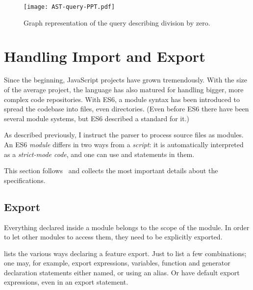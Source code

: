 \begin{figure}[!htb]
	\begin{minipage}{\textwidth}
		
	\end{minipage}
\end{figure}

\begin{figure}[!htb]
  \centering
  \texttt{[image: AST-query-PPT.pdf]}
  \caption{Graph representation of the query describing division by zero.}
  \label{fig:AST-query-PPT}
\end{figure}


\section{Handling Import and Export}
\label{sect:handling-import-export}
Since the beginning, JavaScript projects have grown tremendously. With the size of the average project, the language has also matured for handling bigger, more complex code repositories. With ES6, a module syntax has been introduced to spread the codebase into files, even directories. (Even before ES6 there have been several module systems, but ES6 described a standard for it.)

As described previously, I instruct the parser to process source files as modules. An ES6 \emph{module} differs in two ways from a \emph{script}: it is automatically interpreted as a \emph{strict-mode code}, and one can use  and  statements in them.

This section follows~\cite{ES6InDepth,ES6import,ES6export} and collects the most important details about the specifications.


\subsection{Export}
Everything declared inside a module belongs to the scope of the module. In order to let other modules to access them, they need to be explicitly exported.

 lists the various ways declaring a feature export. Just to list a few combinations; one may, for example, export expressions, variables, function and generator declaration statements either named, or using an alias. Or have default export expressions, even in an export statement.

